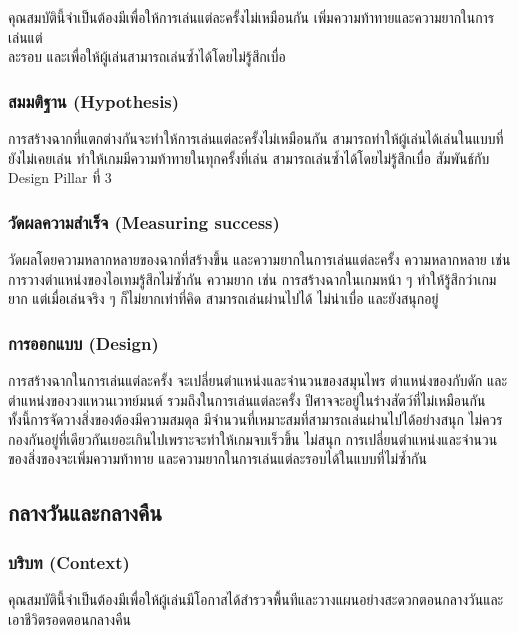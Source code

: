 คุณสมบัตินี้จำเป็นต้องมีเพื่อให้การเล่นแต่ละครั้งไม่เหมือนกัน เพิ่มความท้าทายและความยากในการเล่นแต่ \\ ละรอบ และเพื่อให้ผู้เล่นสามารถเล่นซ้ำได้โดยไม่รู้สึกเบื่อ

\subsubsection{สมมติฐาน (Hypothesis)}

การสร้างฉากที่แตกต่างกันจะทำให้การเล่นแต่ละครั้งไม่เหมือนกัน สามารถทำให้ผู้เล่นได้เล่นในแบบที่ยังไม่เคยเล่น ทำให้เกมมีความท้าทายในทุกครั้งที่เล่น สามารถเล่นซ้ำได้โดยไม่รู้สึกเบื่อ สัมพันธ์กับ Design Pillar ที่ 3

\subsubsection{วัดผลความสำเร็จ (Measuring success)}

วัดผลโดยความหลากหลายของฉากที่สร้างขึ้น และความยากในการเล่นแต่ละครั้ง ความหลากหลาย เช่น การวางตำแหน่งของไอเทมรู้สึกไม่ซ้ำกัน ความยาก เช่น การสร้างฉากในเกมหน้า ๆ ทำให้รู้สึกว่าเกมยาก แต่เมื่อเล่นจริง ๆ ก็ไม่ยากเท่าที่คิด สามารถเล่นผ่านไปได้ ไม่น่าเบื่อ และยังสนุกอยู่

\subsubsection{การออกแบบ (Design)}

การสร้างฉากในการเล่นแต่ละครั้ง จะเปลี่ยนตำแหน่งและจำนวนของสมุนไพร ตำแหน่งของกับดัก และตำแหน่งของวงแหวนเวทย์มนต์ รวมถึงในการเล่นแต่ละครั้ง ปีศาจจะอยู่ในร่างสัตว์ที่ไม่เหมือนกัน ทั้งนี้การจัดวางสิ่งของต้องมีความสมดุล มีจำนวนที่เหมาะสมที่สามารถเล่นผ่านไปได้อย่างสนุก ไม่ควรกองกันอยู่ที่เดียวกันเยอะเกินไปเพราะจะทำให้เกมจบเร็วขึ้น ไม่สนุก การเปลี่ยนตำแหน่งและจำนวนของสิ่งของจะเพิ่มความท้าทาย และความยากในการเล่นแต่ละรอบได้ในแบบที่ไม่ซ้ำกัน  

\subsection{กลางวันและกลางคืน}

\subsubsection{บริบท (Context)}

คุณสมบัตินี้จำเป็นต้องมีเพื่อให้ผู้เล่นมีโอกาสได้สำรวจพื้นทีและวางแผนอย่างสะดวกตอนกลางวันและเอาชีวิตรอดตอนกลางคืน

